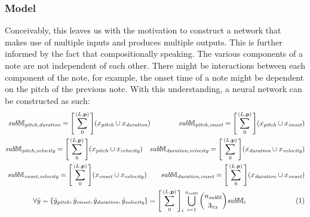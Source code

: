 \documentclass{article}
\newcommand\numberthis{\addtocounter{equation}{1}\tag{\theequation}}
\begin{document}
\subsubsection{Model}
Conceivably, this leaves us with the motivation to construct a network that makes use of multiple inputs and produces multiple outputs. This is further informed by the fact that compositionally speaking. The various components of a note are not independent of each other. There might be interactions between each component of the note, for example, the onset time of a note might be dependent on the pitch of the previous note. With this understanding, a neural network can be constructed as such:
\begin{align*}
	\label{eq:nn1_expand}
	\textit{sub}\mathbb{M}_{\textit{pitch,duration}} = \Bigg[\sum^{(L,\mathbf{p})}_0\Bigg](x_{\textit{pitch}}\cup x_{\textit{duration}})       \quad\quad\quad\quad
	\textit{sub}\mathbb{M}_{\textit{pitch,onset}} = \Bigg[\sum^{(L,\mathbf{p})}_0\Bigg](x_{\textit{pitch}}\cup x_{\textit{onset}})              \\
	\textit{sub}\mathbb{M}_{\textit{pitch,velocity}} = \Bigg[\sum^{(L,\mathbf{p})}_0\Bigg](x_{\textit{pitch}}\cup x_{\textit{velocity}})     \quad
	\textit{sub}\mathbb{M}_{\textit{duration,velocity}} = \Bigg[\sum^{(L,\mathbf{p})}_0\Bigg](x_{\textit{duration}} \cup x_{\textit{velocity}}) \\
	\textit{sub}\mathbb{M}_{\textit{onset,velocity}} = \Bigg[\sum^{(L,\mathbf{p})}_0\Bigg](x_{\textit{onset}}\cup x_{\textit{velocity}})     \quad\quad
	\textit{sub}\mathbb{M}_{\textit{duration,onset}} = \Bigg[\sum^{(L,\mathbf{p})}_0\Bigg](x_{\textit{duration}}\cup x_{\textit{onset}})        \\
	\forall \hat{y} = \{\hat{y}_{\textit{pitch}}, \hat{y}_{\textit{onset}}, \hat{y}_{\textit{duration}},\hat{y}_{\textit{velocity}}\} = \Bigg[\sum^{(L,\mathbf{p})}_0\Bigg]_i\bigcup_{i=1}^{n_{\textit{sub}\mathbb{M}}}\genfrac(){0pt}{0}{n_{\textit{sub}\mathbb{M}}}{3_{\forall x}}\textit{sub}\mathbb{M}_i\quad\quad\quad\quad\quad
	\numberthis
\end{align*}
\end{document}
